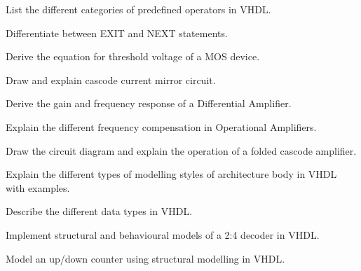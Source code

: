 \item List the different categories of predefined operators in VHDL.

\item Differentiate between EXIT and NEXT statements.

\markB
\partC

\item \iitem \iitem Derive the equation for threshold voltage of a MOS device.

\item Draw and explain cascode current mirror circuit.

\ene

\Or

\item Derive the gain and frequency response of a Differential Amplifier.

\ene

\newpage \again

\item \iitem Explain the different frequency compensation in Operational Amplifiers.

\Or

\item Draw the circuit diagram and explain the operation of a folded cascode amplifier.

\ene

\item \iitem Explain the different types of modelling styles of architecture body in VHDL with examples.

\Or

\item Describe the different data types in VHDL.

\ene

\item \iitem Implement structural and behavioural models of a 2:4 decoder in VHDL.

\Or

\item Model an up/down counter using structural modelling in VHDL.

\ene

\markC

\ene


\newpage





\sub{\subj}

\maxtime


